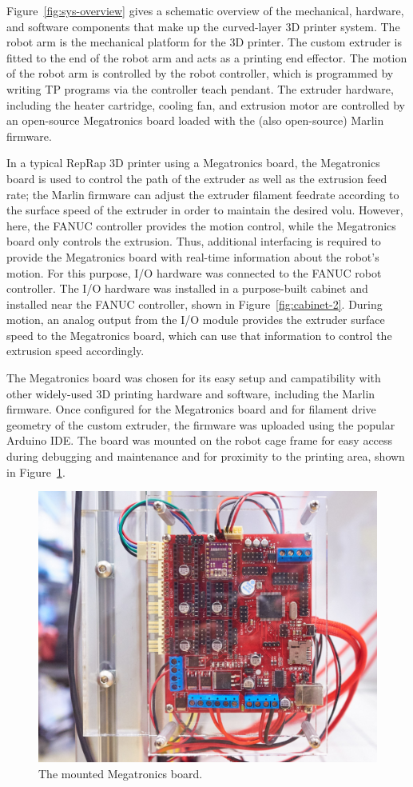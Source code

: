 Figure~\ref{fig:sys-overview} gives a schematic overview of the mechanical, hardware, and software components that make up the curved-layer 3D printer system. The robot arm is the mechanical platform for the 3D printer. The custom extruder is fitted to the end of the robot arm and acts as a printing end effector. The motion of the robot arm is controlled by the robot controller, which is programmed by writing TP programs via the controller teach pendant. The extruder hardware, including the heater cartridge, cooling fan, and extrusion motor are controlled by an open-source Megatronics board loaded with the (also open-source) Marlin firmware. 

In a typical RepRap 3D printer using a Megatronics board, the Megatronics board is used to control the path of the extruder as well as the extrusion feed rate; the Marlin firmware can adjust the extruder filament feedrate according to the surface speed of the extruder in order to maintain the desired volu. However, here, the FANUC controller provides the motion control, while the Megatronics board only controls the extrusion. Thus, additional interfacing is required to provide the Megatronics board with real-time information about the robot's motion. For this purpose, I/O hardware was connected to the FANUC robot controller. The I/O hardware was installed in a purpose-built cabinet and installed near the FANUC controller, shown in Figure~\ref{fig:cabinet-2}. During motion, an analog output from the I/O module provides the extruder surface speed to the Megatronics board, which can use that information to control the extrusion speed accordingly.

The Megatronics board was chosen for its easy setup and campatibility with other widely-used 3D printing hardware and software, including the Marlin firmware. Once configured for the Megatronics board and for filament drive geometry of the custom extruder, the firmware was uploaded using the popular Arduino IDE. The board was mounted on the robot cage frame for easy access during debugging and maintenance and for proximity to the printing area, shown in Figure~\ref{fig:mounted-mega}.

\begin{figure}
    \centering
    \includegraphics[width=.8\linewidth]{figures/mounted-mega}
    \caption{The mounted Megatronics board.}
    \label{fig:mounted-mega}
\end{figure}


